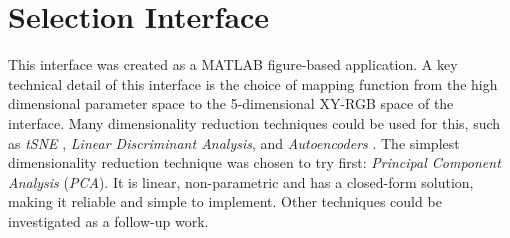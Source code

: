 \documentclass[11pt, oneside]{report}   	%
\begin{document}
\section{Selection Interface}\label{sec:SelectionDescription}
This interface was created as a MATLAB figure-based application. A key technical detail of this interface is the choice of mapping function from the high dimensional parameter space to the 5-dimensional XY-RGB space of the interface. Many dimensionality reduction techniques could be used for this, such as \emph{tSNE} \cite{InfiniteDrum}, \emph{Linear Discriminant Analysis}, and \emph{Autoencoders} \cite{NSynth}. The simplest dimensionality reduction technique was chosen to try first: \emph{Principal Component Analysis} (\emph{PCA}). It is linear, non-parametric and has a closed-form solution, making it reliable and simple to implement. Other techniques could be investigated as a follow-up work.
\end{document}
